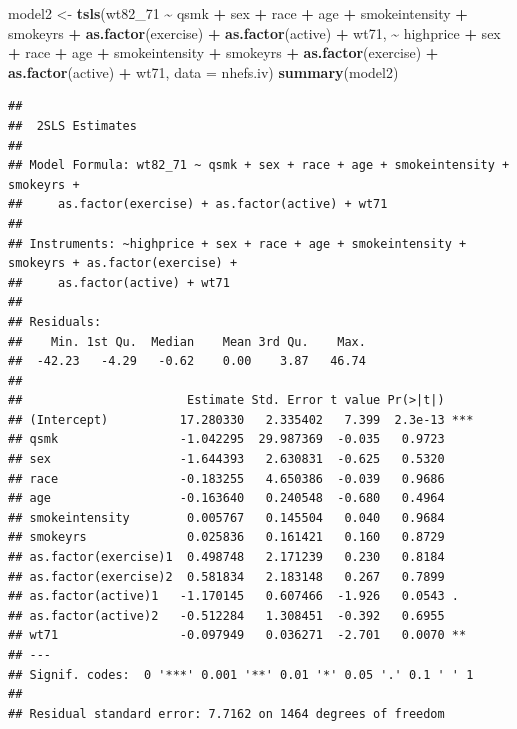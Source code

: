 \documentclass[
  10pt,
]{book}
\newenvironment{Shaded}{\begin{snugshade}}{\end{snugshade}}
\newcommand{\DataTypeTok}[1]{\textcolor[rgb]{0.13,0.29,0.53}{#1}}
\newcommand{\DecValTok}[1]{\textcolor[rgb]{0.00,0.00,0.81}{#1}}
\newcommand{\KeywordTok}[1]{\textcolor[rgb]{0.13,0.29,0.53}{\textbf{#1}}}
\newcommand{\NormalTok}[1]{#1}
\newcommand{\OperatorTok}[1]{\textcolor[rgb]{0.81,0.36,0.00}{\textbf{#1}}}
\newcommand{\StringTok}[1]{\textcolor[rgb]{0.31,0.60,0.02}{#1}}
\begin{document}
\begin{Shaded}
\begin{Highlighting}[]
\NormalTok{model2 \textless{}{-}}\StringTok{ }\KeywordTok{tsls}\NormalTok{(wt82\_}\DecValTok{71} \OperatorTok{\textasciitilde{}}\StringTok{ }\NormalTok{qsmk }\OperatorTok{+}\StringTok{ }\NormalTok{sex }\OperatorTok{+}\StringTok{ }\NormalTok{race }\OperatorTok{+}\StringTok{ }\NormalTok{age }\OperatorTok{+}\StringTok{ }\NormalTok{smokeintensity }\OperatorTok{+}\StringTok{ }\NormalTok{smokeyrs }\OperatorTok{+}\StringTok{ }
\StringTok{                      }\KeywordTok{as.factor}\NormalTok{(exercise) }\OperatorTok{+}\StringTok{ }\KeywordTok{as.factor}\NormalTok{(active) }\OperatorTok{+}\StringTok{ }\NormalTok{wt71,}
             \OperatorTok{\textasciitilde{}}\StringTok{ }\NormalTok{highprice }\OperatorTok{+}\StringTok{ }\NormalTok{sex }\OperatorTok{+}\StringTok{ }\NormalTok{race }\OperatorTok{+}\StringTok{ }\NormalTok{age }\OperatorTok{+}\StringTok{ }\NormalTok{smokeintensity }\OperatorTok{+}\StringTok{ }\NormalTok{smokeyrs }\OperatorTok{+}\StringTok{ }\KeywordTok{as.factor}\NormalTok{(exercise) }\OperatorTok{+}
\StringTok{               }\KeywordTok{as.factor}\NormalTok{(active) }\OperatorTok{+}\StringTok{ }\NormalTok{wt71, }\DataTypeTok{data =}\NormalTok{ nhefs.iv)}
\KeywordTok{summary}\NormalTok{(model2)}
\end{Highlighting}
\end{Shaded}

\begin{verbatim}
## 
##  2SLS Estimates
## 
## Model Formula: wt82_71 ~ qsmk + sex + race + age + smokeintensity + smokeyrs + 
##     as.factor(exercise) + as.factor(active) + wt71
## 
## Instruments: ~highprice + sex + race + age + smokeintensity + smokeyrs + as.factor(exercise) + 
##     as.factor(active) + wt71
## 
## Residuals:
##    Min. 1st Qu.  Median    Mean 3rd Qu.    Max. 
##  -42.23   -4.29   -0.62    0.00    3.87   46.74 
## 
##                       Estimate Std. Error t value Pr(>|t|)    
## (Intercept)          17.280330   2.335402   7.399  2.3e-13 ***
## qsmk                 -1.042295  29.987369  -0.035   0.9723    
## sex                  -1.644393   2.630831  -0.625   0.5320    
## race                 -0.183255   4.650386  -0.039   0.9686    
## age                  -0.163640   0.240548  -0.680   0.4964    
## smokeintensity        0.005767   0.145504   0.040   0.9684    
## smokeyrs              0.025836   0.161421   0.160   0.8729    
## as.factor(exercise)1  0.498748   2.171239   0.230   0.8184    
## as.factor(exercise)2  0.581834   2.183148   0.267   0.7899    
## as.factor(active)1   -1.170145   0.607466  -1.926   0.0543 .  
## as.factor(active)2   -0.512284   1.308451  -0.392   0.6955    
## wt71                 -0.097949   0.036271  -2.701   0.0070 ** 
## ---
## Signif. codes:  0 '***' 0.001 '**' 0.01 '*' 0.05 '.' 0.1 ' ' 1
## 
## Residual standard error: 7.7162 on 1464 degrees of freedom
\end{verbatim}
\end{document}
